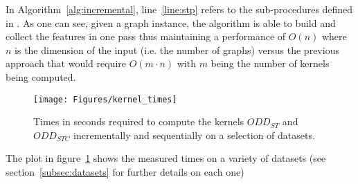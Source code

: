 In Algorithm~\ref{alg:incremental}, line~\ref{line:stp} refers to the sub-procedures
defined in \cite{nnavarin, rtesselli}.
As one can see, given a graph instance, the algorithm is able to build and
collect the features in one pass thus maintaining a performance of $O(n)$ where
$n$ is the dimension of the input (i.e. the number of graphs) versus the
previous approach that would require $O(m \cdot n)$ with $m$ being the number of
kernels being computed.

\begin{figure}[ht]
    \centering
    \texttt{[image: Figures/kernel\_times]}
    \caption{Times in seconds required to compute the kernels $ODD_{ST}$ and 
    $ODD_{STC}$ incrementally and sequentially on a selection of datasets.}
    \label{fig:times}
\end{figure}

The plot in figure~\ref{fig:times} shows the measured times on a variety of
datasets (see section~\ref{subsec:datasets} for further details on each one)


